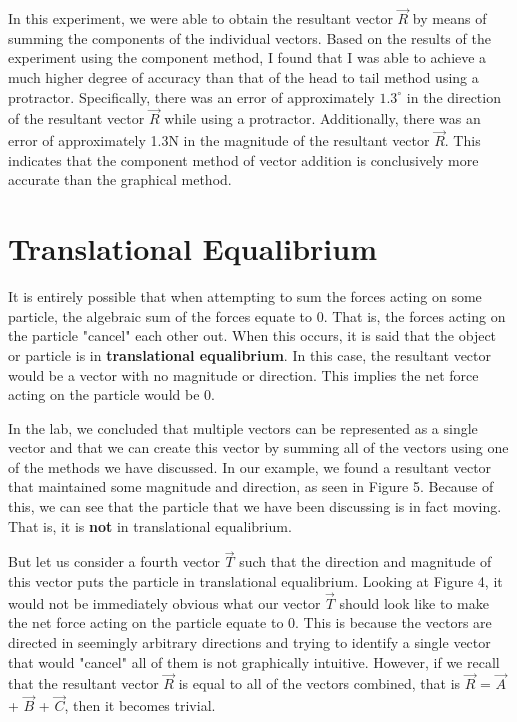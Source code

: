 \documentclass[12pt]{article}
\begin{document}
In this experiment, we were able to obtain the resultant vector $\vec{R}$ by means of summing the components of the individual vectors. Based on the results of the experiment using the component method, I found that I was able to achieve a much higher degree of accuracy than that of the head to tail method using a protractor. Specifically, there was an error of approximately $1.3^\circ$ in the direction of the resultant vector $\vec{R}$ while using a protractor. Additionally, there was an error of approximately 1.3N in the magnitude of the resultant vector $\vec{R}$. This indicates that the component method of vector addition is conclusively more accurate than the graphical method.

\section{Translational Equalibrium}
It is entirely possible that when attempting to sum the forces acting on some particle, the algebraic sum of the forces equate to 0. That is, the forces acting on the particle "cancel" each other out. When this occurs, it is said that the object or particle is in \textbf{translational equalibrium}. In this case, the resultant vector would be a vector with no magnitude or direction. This implies the net force acting on the particle would be 0.

In the lab, we concluded that multiple vectors can be represented as a single vector and that we can create this vector by summing all of the vectors using one of the methods we have discussed. In our example, we found a resultant vector that maintained some magnitude and direction, as seen in Figure 5. Because of this, we can see that the particle that we have been discussing is in fact moving. That is, it is \textbf{not} in translational equalibrium.

But let us consider a fourth vector $\vec{T}$ such that the direction and magnitude of this vector puts the particle in translational equalibrium. Looking at Figure 4, it would not be immediately obvious what our vector $\vec{T}$ should look like to make the net force acting on the particle equate to 0. This is because the vectors are directed in seemingly arbitrary directions and trying to identify a single vector that would "cancel" all of them is not graphically intuitive. However, if we recall that the resultant vector $\vec{R}$ is equal to all of the vectors combined, that is $\vec{R}$ = $\vec{A}$ + $\vec{B}$ + $\vec{C}$, then it becomes trivial.
\end{document}
